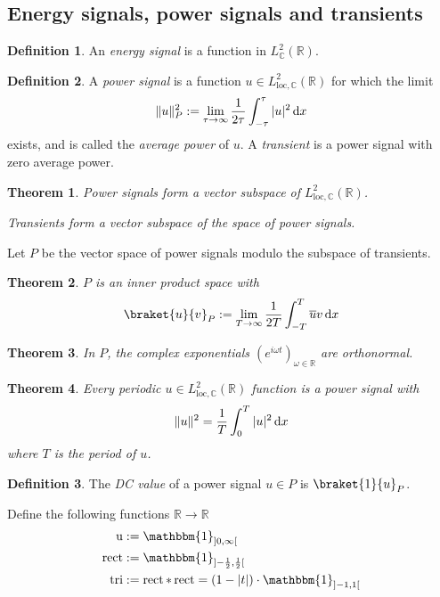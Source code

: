 \documentclass[11pt, a4paper, openany]{book}
\newtheorem{thm}{Theorem}\newtheorem{lem}{Lemma}\newtheorem{crl}{Corollary}
\theoremstyle{definition}
\newtheorem{define}{Definition}\newtheorem{exam}{Example}\newtheorem{remark}{Remark}
\begin{document}
\subsection{Energy signals, power signals and transients}
    \begin{define}
        An \textit{energy signal} is a function in $L^2_\mathbb{C}(\mathbb{R})$.
    \end{define}
    \begin{define}
        

        A \textit{power signal} is a function $u\in L_{\text{loc},\mathbb{C}}^2(\mathbb{R})$ for which the limit
        \[
            \|u\|_P^2:=\lim_{\tau\to\infty}\frac{1}{2\tau}\int_{-\tau}^\tau |u|^2\odif x
        \]
        exists, and is called the \textit{average power} of $u$. A \textit{transient} is a power signal with zero average power.
    \end{define}
    \begin{thm}
        Power signals form a vector subspace of $L_{\text{loc},\mathbb{C}}^2(\mathbb{R})$. 
        
        Transients form a vector subspace of the space of power signals.
    \end{thm}
    Let $P$ be the vector space of power signals modulo the subspace of transients.
    \begin{thm}
        $P$ is an inner product space with
        \[
            \braket{u}{v}_P:=\lim_{T\to\infty}\frac{1}{2T}\int_{-T}^T \overline{u}v\odif x
        \]
    \end{thm}
    \begin{thm}
        In $P$, the complex exponentials $(e^{i\omega t})_{\omega\in\mathbb{R}}$ are orthonormal.
    \end{thm}
    \begin{thm}
        Every periodic $u\in L_{\text{loc},\mathbb{C}}^2(\mathbb{R})$ function is a power signal with
        \[
            \|u\|^2=\frac{1}{T}\int_{0}^T |u|^2\odif x
        \]
        where $T$ is the period of $u$.
    \end{thm}
    \begin{define}
        The \textit{DC value} of a power signal $u\in P$ is $\braket{1}{u}_{P}$.
    \end{define}
    Define the following functions $\mathbb{R}\rightarrow \mathbb{R}$
    \begin{align*}
        \operatorname{u}&:=\mathbbm{1}_{]0,\infty[}\\
        \operatorname{rect}&:=\mathbbm{1}_{]-\frac{1}{2},\frac{1}{2}[}\\
        \operatorname{tri}&:=\operatorname{rect}*\operatorname{rect}=(1-|t|)\cdot \mathbbm{1}_{]-1,1[}
    \end{align*}
\end{document}
